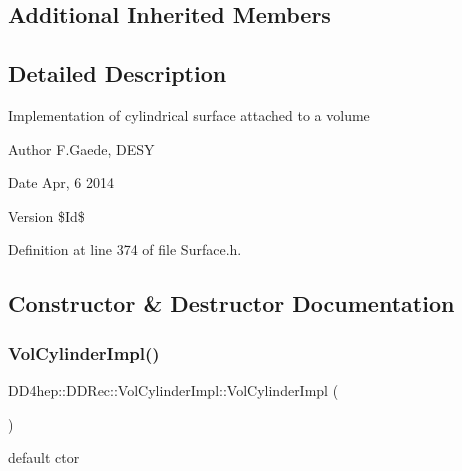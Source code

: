 \subsection*{Additional Inherited Members}


\subsection{Detailed Description}
Implementation of cylindrical surface attached to a volume \begin{DoxyAuthor}{Author}
F.\+Gaede, D\+E\+SY 
\end{DoxyAuthor}
\begin{DoxyDate}{Date}
Apr, 6 2014 
\end{DoxyDate}
\begin{DoxyVersion}{Version}
\$\+Id\$ 
\end{DoxyVersion}


Definition at line 374 of file Surface.\+h.



\subsection{Constructor \& Destructor Documentation}
\hypertarget{class_d_d4hep_1_1_d_d_rec_1_1_vol_cylinder_impl_a9a2fc6a4cef827e0636f7591add7f73b}{}\label{class_d_d4hep_1_1_d_d_rec_1_1_vol_cylinder_impl_a9a2fc6a4cef827e0636f7591add7f73b} 
\subsubsection{\texorpdfstring{Vol\+Cylinder\+Impl()}{VolCylinderImpl()}\hspace{0.1cm}{\footnotesize\ttfamily [1/2]}}
{\footnotesize\ttfamily D\+D4hep\+::\+D\+D\+Rec\+::\+Vol\+Cylinder\+Impl\+::\+Vol\+Cylinder\+Impl (\begin{DoxyParamCaption}{ }\end{DoxyParamCaption})\hspace{0.3cm}{\ttfamily [inline]}}



default c\textquotesingle{}tor 



